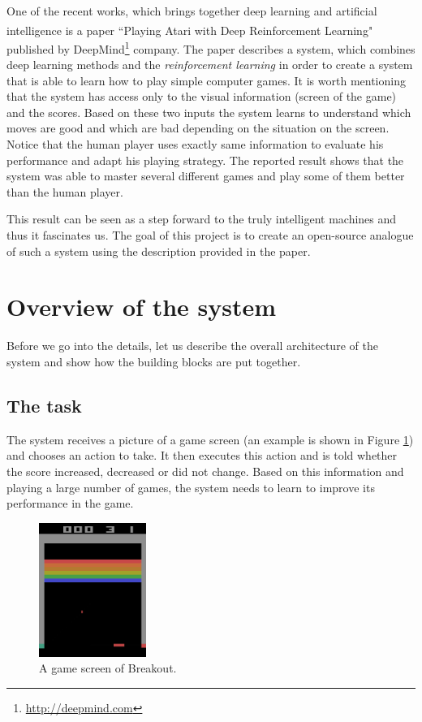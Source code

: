 \documentclass[a4paper,12pt]{article}
\begin{document}
One of the recent works, which brings together deep learning and artificial intelligence is a paper ``Playing Atari with Deep Reinforcement Learning"\textsuperscript{\cite{mnih2013playing}} published by DeepMind\footnote{\url{http://deepmind.com}} company. The paper describes a system, which combines deep learning methods and the \emph{reinforcement learning} in order to create a system that is able to learn how to play simple computer games. It is worth mentioning that the system has access only to the visual information (screen of the game) and the scores. Based on these two inputs the system learns to understand which moves are good and which are bad depending on the situation on the screen. Notice that the human player uses exactly same information to evaluate his performance and adapt his playing strategy. The reported result shows that the system was able to master several different games and play some of them better than the human player.

This result can be seen as a step forward to the truly intelligent machines and thus it fascinates us. The goal of this project is to create an open-source analogue of such a system using the description provided in the paper.



%
%
\pagebreak
\section{Overview of the system}
Before we go into the details, let us describe the overall architecture of the system and show how the building blocks are put together. 

\subsection{The task}

The system receives a picture of a game screen (an example is shown in Figure \ref{fig:breakoutscreen}) and chooses an action to take. It then executes this action and is told whether the score increased, decreased or did not change. Based on this information and playing a large number of games, the system needs to learn to improve its performance in the game.

\begin{figure}[h]
\centering
\includegraphics[width=3.5cm]{images/fig_gamescreen.png}
\caption{A game screen of Breakout.}
\label{fig:breakoutscreen}
\end{figure}
\end{document}

